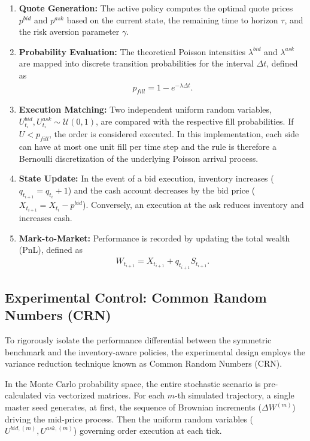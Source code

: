 \begin{enumerate}
    \item \textbf{Quote Generation:} The active policy computes the optimal quote prices $p^{bid}$ and $p^{ask}$ based on the current state, the remaining time to horizon $\tau$, and the risk aversion parameter $\gamma$.
    \item \textbf{Probability Evaluation:} The theoretical Poisson intensities $\lambda^{bid}$ and $\lambda^{ask}$ are mapped into discrete transition probabilities for the interval $\Delta t$, defined as
    \begin{align*}
        p_{fill} = 1 - e^{-\lambda \Delta t}.
    \end{align*}
    \item \textbf{Execution Matching:} Two independent uniform random variables, $U^{bid}_{t_i}, U^{ask}_{t_i} \sim \mathcal{U}(0,1)$, are compared with the respective fill probabilities. If $U < p_{fill}$, the order is considered executed. In this implementation, each side can have at most one unit fill per time step and the rule is therefore a Bernoulli discretization of the underlying Poisson arrival process.
    \item \textbf{State Update:} In the event of a bid execution, inventory increases ($q_{t_{i+1}} = q_{t_i} + 1$) and the cash account decreases by the bid price ($X_{t_{i+1}} = X_{t_i} - p^{bid}$). Conversely, an execution at the ask reduces inventory and increases cash.
    \item \textbf{Mark-to-Market:} Performance is recorded by updating the total wealth (PnL), defined as
    \begin{align*}
        W_{t_{i+1}} = X_{t_{i+1}} + q_{t_{i+1}} S_{t_{i+1}}.
    \end{align*}
\end{enumerate}

\subsection{Experimental Control: Common Random Numbers (CRN)}
To rigorously isolate the performance differential between the symmetric benchmark and the inventory-aware policies, the experimental design employs the variance reduction technique known as Common Random Numbers (CRN).

In the Monte Carlo probability space, the entire stochastic scenario is pre-calculated via vectorized matrices. For each $m$-th simulated trajectory, a single master seed generates, at first, the sequence of Brownian increments ($\Delta W^{(m)}$) driving the mid-price process. Then the uniform random variables ($U^{bid, (m)}, U^{ask, (m)}$) governing order execution at each tick.

